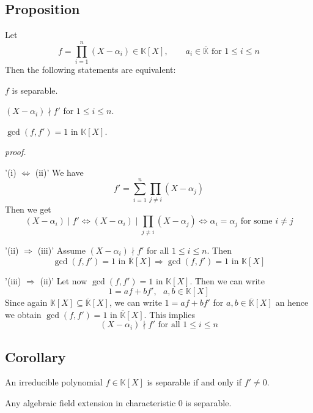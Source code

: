 \documentclass[12pt]{book}
\begin{document}
\begin{spacing}{1.3}
\subsection{Proposition} %
Let $$f=\prod_{i=1}^n (X-\alpha_i) \in \mathbb{K}[X], \qquad a_i \in \overline{\mathbb{K}}\textrm{ for }1 \leqslant i\leqslant n$$
Then the following statements are equivalent:
\begin{compactenum}
\item $f$ is separable.
\item $(X-\alpha_i) \nmid f'$ for $1 \leqslant i \leqslant n$.
\item $\gcd(f,f')=1$ in $\mathbb{K}[X]$.
\end{compactenum}
\textit{proof.}
\begin{compactitem}
\item['(i) $\Leftrightarrow$ (ii)'] We have $$f'=\sum_{i=1}^n \prod_{j\neq i} (X-\alpha_j)$$Then we get
$$(X-\alpha_i) \mid f' \Leftrightarrow (X-\alpha_i) \mid \prod_{j\neq i} (X-\alpha_j) \Leftrightarrow \alpha_i = \alpha_j\textrm{ for some }i\neq j$$
\item['(ii) $\Rightarrow$ (iii)'] Assume $(X-\alpha_i) \nmid f'$ for all $1\leqslant i \leqslant n$. Then $$\gcd(f,f')=1 \textrm{ in }\overline{\mathbb{K}}[X] \Longrightarrow \gcd(f,f')=1 \textrm{ in }\mathbb{K}[X]$$ 
\item['(iii) $\Rightarrow$ (ii)'] Let now $\gcd(f,f')=1$ in $\mathbb{K}[X]$. Then we can write $$1=af+bf', \textrm{  }a,b \in \mathbb{K}[X]$$Since again $\mathbb{K}[X] \subseteq \overline{\mathbb{K}}[X]$, we can write $1=af+bf'$ for $a,b \in \overline{\mathbb{K}}[X]$ an hence we obtain $\gcd(f,f')=1$ in $\overline{\mathbb{K}}[X]$. This implies $$(X-\alpha_i) \nmid f' \textrm{ for all }1 \leqslant i \leqslant n$$
\end{compactitem}

\subsection{Corollary} %
\begin{compactenum}
\item An irreducible polynomial $f \in \mathbb{K}[X]$ is separable if and only if $f' \neq 0$. 
\item Any algebraic field extension in characteristic $0$ is separable.
\end{compactenum}


\end{spacing}
\end{document}
